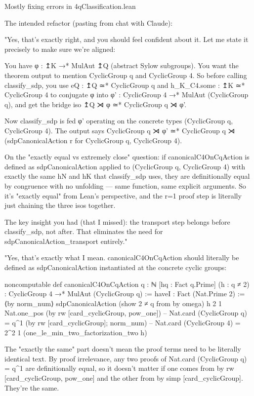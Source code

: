 Mostly fixing errors in 4qClassification.lean

The intended refactor (pasting from chat with Claude):

"Yes, that's exactly right, and you should feel confident about it. Let me state it precisely to make sure we're aligned:

  You have φ : ↥K →* MulAut ↥Q (abstract Sylow subgroups). You want the theorem output to mention CyclicGroup q and CyclicGroup 4. So before calling classify_sdp, you use eQ : ↥Q ≃* CyclicGroup q and
  h_K_C4.some : ↥K ≃* CyclicGroup 4 to conjugate φ into φ' : CyclicGroup 4 →* MulAut (CyclicGroup q), and get the bridge iso ↥Q ⋊ φ ≃* CyclicGroup q ⋊ φ'.

  Now classify_sdp is fed φ' operating on the concrete types (CyclicGroup q, CyclicGroup 4). The output says CyclicGroup q ⋊ φ' ≃* CyclicGroup q ⋊ (sdpCanonicalAction r for CyclicGroup q, CyclicGroup 4).

  On the "exactly equal vs extremely close" question: if canonicalC4OnCqAction is defined as sdpCanonicalAction applied to (CyclicGroup q, CyclicGroup 4) with exactly the same hN and hK that classify_sdp
  uses, they are definitionally equal by congruence with no unfolding — same function, same explicit arguments. So it's "exactly equal" from Lean's perspective, and the r=1 proof step is literally just
  chaining the three isos together.

  The key insight you had (that I missed): the transport step belongs before classify_sdp, not after. That eliminates the need for sdpCanonicalAction_transport entirely."

"Yes, that's exactly what I mean. canonicalC4OnCqAction should literally be defined as sdpCanonicalAction instantiated at the concrete cyclic groups:

  noncomputable def canonicalC4OnCqAction {q : ℕ} [hq : Fact q.Prime] (h : q ≠ 2) :
      CyclicGroup 4 →* MulAut (CyclicGroup q) :=
    haveI : Fact (Nat.Prime 2) := ⟨by norm_num⟩
    sdpCanonicalAction (show 2 ≠ q from by omega) h 2 1 Nat.one_pos
      (by rw [card_cyclicGroup, pow_one])   -- Nat.card (CyclicGroup q) = q^1
      (by rw [card_cyclicGroup]; norm_num)  -- Nat.card (CyclicGroup 4) = 2^2
      1 (one_le_min_two_factorization_two h)

  The "exactly the same" part doesn't mean the proof terms need to be literally identical text. By proof irrelevance, any two proofs of Nat.card (CyclicGroup q) = q^1 are definitionally equal, so it doesn't
  matter if one comes from by rw [card_cyclicGroup, pow_one] and the other from by simp [card_cyclicGroup]. They're the same.

